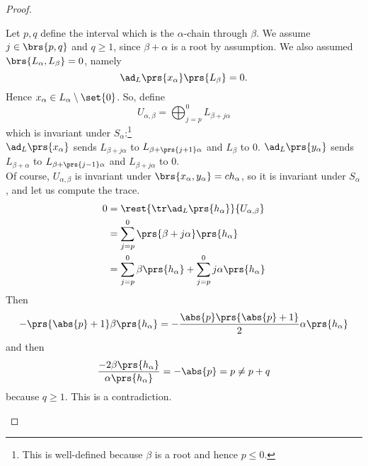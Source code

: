 \documentclass[10pt,a4paper,twoside,openany,hidelinks]{book}
\begin{document}
\begin{proof}
\begin{enumerate}
Let $p,q$ define the interval which is the $\alpha$-chain through $\beta$. We assume
$j \in \brs{p,q}$ and $q \geq 1$, since $\beta + \alpha$ is a root by assumption.
We also assumed $\brs{L_{\alpha}, L_{\beta}} = 0$, namely
\[\ad_L\prs{x_{\alpha}}\prs{L_{\beta}} = 0 \text{.}\]
Hence $x_{\alpha} \in L_{\alpha} \setminus \set{0}$.
So, define
\[U_{\alpha,\beta} = \bigoplus_{j=p}^0 L_{\beta + j\alpha}\]
which is invariant under $S_{\alpha}$:\footnote{This is well-defined because $\beta$ is a root and hence $p \leq 0$.}\\
$\ad_L\prs{x_{\alpha}}$ sends $L_{\beta + j\alpha}$ to $L_{\beta + \prs{j+1}\alpha}$ and $L_{\beta}$ to $0$. $\ad_L\prs{y_{\alpha}}$ sends $L_{\beta + \alpha}$ to $L_{\beta + \prs{j-1}\alpha}$ and $L_{\beta + j\alpha}$ to $0$.\\
Of course, $U_{\alpha,\beta}$ is invariant under $\brs{x_{\alpha},y_{\alpha}} = ch_{\alpha}$, so it is invariant under $S_{\alpha}$, and let us compute the trace.
\begin{align*}
0 &= \rest{\tr \ad_L\prs{h_{\alpha}}}{U_{\alpha,\beta}} \\&=
\sum_{j=p}^0 \prs{\beta + j\alpha}\prs{h_{\alpha}} \\&= \sum_{j=p}^0 \beta\prs{h_{\alpha}} + \sum_{j=p}^0 j\alpha\prs{h_{\alpha}}
\end{align*}
Then
\[- \prs{\abs{p} + 1}\beta\prs{h_{\alpha}} = -\frac{\abs{p}\prs{\abs{p} + 1}}{2} \alpha\prs{h_{\alpha}}\]
and then
\[\frac{-2 \beta\prs{h_{\alpha}}}{\alpha\prs{h_{\alpha}}} = -\abs{p} = p \neq p + q\]
because $q \geq 1$. This is a contradiction.
\end{enumerate}
\end{proof}

\backmatter
\end{document}
